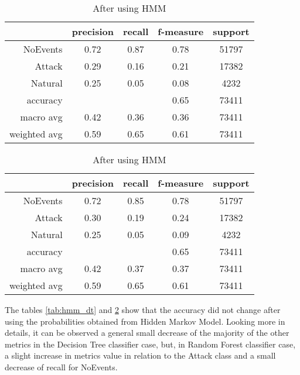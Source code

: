 \begin{table}[H]
    \centering \footnotesize
    \caption{Hidden Markov Model manipulation results for Random Forest classifier}  \label{tab:hmm_rf}
    \begin{subtable}[t]{.5\linewidth}
        \centering
        \caption{Before using HMM} 
        \begin{tabular}{rcccc}\toprule
            & precision    &recall & f-measure  & support \\\midrule
            NoEvents   &    0.72  &    0.87 &     0.78 &  51797 \\
            Attack     &  0.29    &  0.16   &   0.21   &  17382 \\
           Natural     &  0.25    &  0.05   &   0.08   &   4232 \\
          accuracy     &          &         &   0.65   &  73411 \\
         macro avg     &  0.42    &  0.36   &   0.36   &  73411 \\
      weighted avg     &  0.59    &  0.65   &   0.61   &  73411 \\ \bottomrule
        \end{tabular}
    \end{subtable}%
    \begin{subtable}[t]{.5\linewidth}
        \centering
        \caption{After using HMM}
        \begin{tabular}{rcccc}\toprule
        & precision &   recall & f-measure  & support \\\midrule
        NoEvents   &    0.72 &     0.85  &    0.78 &  51797\\
        Attack     &  0.30   &   0.19    &  0.24   &  17382\\
       Natural     &  0.25   &   0.05    &  0.09   &   4232\\
      accuracy     &         &           &  0.65   &  73411\\
     macro avg     &  0.42   &   0.37    &  0.37   &  73411\\
  weighted avg     &  0.59   &   0.65    &  0.61   &  73411\\ \bottomrule   
        \end{tabular}
    \end{subtable}
\end{table}

The tables \ref{tab:hmm_dt} and \ref{tab:hmm_rf} show that the accuracy did not change after using the probabilities obtained from Hidden Markov Model. Looking more in details, it can be observed a general small decrease of the majority of the other metrics in the Decision Tree classifier case, but, in Random Forest classifier case, a slight increase in metrics value in relation to the Attack class and a small decrease of recall for NoEvents.

